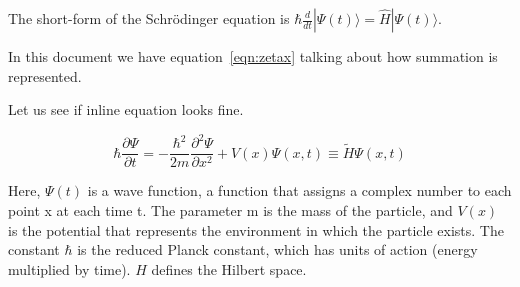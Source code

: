 \documentclass[a4paper, 12pt]{article}
\begin{document}
\setlength{\parindent}{10ex}
The short-form of the Schrödinger equation is $\hbar \frac{d}{d t}|\Psi(t)\rangle=\hat{H}|\Psi(t)\rangle$. \par
\noindent %
In this document we have equation~\ref{eqn:zetax} talking about how summation is represented. 



  



\noindent Let us see if inline equation looks fine.

\begin{equation}
    \hbar \frac{\partial \Psi}{\partial t}=-\frac{\hbar^{2}}{2 m} \frac{\partial^{2} \Psi}{\partial x^{2}}+V(x) \Psi(x, t) \equiv \tilde{H} \Psi(x, t)
        \label{eqn:zetax}
\end{equation}

\noindent Here, $\Psi(t)$ is a wave function, a function that assigns a complex number to each point x at each time t. The parameter m is the mass of the particle, and $V(x) $ is the potential that represents the environment in which the particle exists. The constant $\hbar$  is the reduced Planck constant, which has units of action (energy multiplied by time). $\hat{H}$ defines the Hilbert space.
\end{document}
